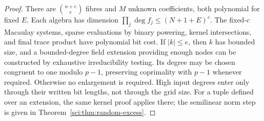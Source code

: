 \begin{proof}
There are \(\binom{n+e}{e}\) fibres and \(M\) unknown coefficients,
both polynomial for fixed \(E\). Each algebra has dimension
\(\prod_j\deg f_j\leq(N+1+E)^c\). The fixed-\(c\) Macaulay
systems, sparse evaluations by binary powering, kernel intersections,
and final trace product have polynomial bit cost. If \(|k|\leq e\),
then \(k\) has bounded size, and a bounded-degree field extension
providing enough nodes can be constructed by exhaustive irreducibility
testing. Its degree may be chosen congruent to one modulo \(p-1\),
preserving coprimality with \(p-1\) whenever required. Otherwise no
enlargement is required. High input degrees enter
only through their written bit lengths, not through the grid size.
For a tuple defined over an extension, the same kernel proof applies
there; the semilinear norm step is given in
Theorem~\ref{sci:thm:random-excess}.
\end{proof}

